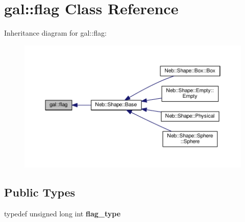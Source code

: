 \hypertarget{classgal_1_1flag}{\section{gal\-:\-:flag Class Reference}
\label{classgal_1_1flag}
}


Inheritance diagram for gal\-:\-:flag\-:
\nopagebreak
\begin{figure}[H]
\begin{center}
\leavevmode
\includegraphics[width=350pt]{classgal_1_1flag__inherit__graph}
\end{center}
\end{figure}
\subsection*{Public Types}
\begin{DoxyCompactItemize}
\item 
\hypertarget{classgal_1_1flag_a29c4c2b58d78fb8bc8e5f366d8f79c13}{typedef unsigned long int {\bfseries flag\-\_\-type}}\label{classgal_1_1flag_a29c4c2b58d78fb8bc8e5f366d8f79c13}

\end{DoxyCompactItemize}

